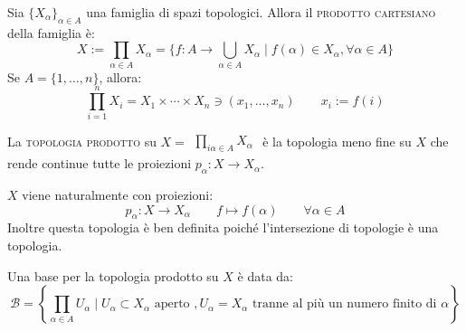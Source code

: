 \begin{defn} 
	Sia $\{X_\alpha\}_{\alpha \in A}$ una famiglia di spazi topologici. Allora
	il \textsc{prodotto cartesiano} della famiglia è:
	$$X:=\prod_{\alpha \in A} X_\alpha = \{f:A \longrightarrow \bigcup _{\alpha
	\in A} X_\alpha  \mid f(\alpha)\in X_\alpha, \forall \alpha \in A\} $$
	Se $A=\{1, \dots ,n\}$, allora:
	$$\prod_{i=1}^n X_i=X_1 \times \cdots \times X_n \ni (x_1, \dots ,x_n)
	\qquad x_i:=f(i)$$
\end{defn}
\begin{defn}
	La \textsc{topologia prodotto} su $X=\begin{matrix} \prod_{i\alpha \in A}
	X_\alpha \end{matrix}	$ è la topologia meno fine su $X$ che rende
	continue tutte le proiezioni $p_\alpha : X \longrightarrow X_\alpha$.
\end{defn}
\begin{oss}
	$X$ viene naturalmente con proiezioni:
	$$p_\alpha :X \longrightarrow X_\alpha \qquad f \longmapsto f(\alpha) \qquad
	\forall \alpha \in A$$
	Inoltre questa topologia è ben definita poiché l'intersezione di topologie è
	una topologia.
\end{oss}
\begin{prop}
	Una base per la topologia prodotto su $X$ è data da:
	$$\mathcal{B}=\left \{\prod_{\alpha \in A} U_\alpha \mid U_\alpha \subset
	X_\alpha \text{ aperto }, U_\alpha =X_\alpha \text{ tranne al più 		un
	numero finito di }\alpha \right \}$$
\end{prop}

